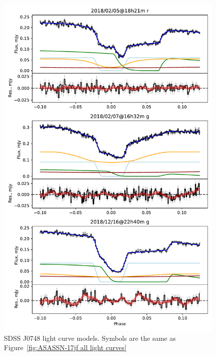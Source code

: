 \begin{figure}
    \centering
    \includegraphics[width=\textwidth]{figures/results/SDSS0748/SDSS0748_1.pdf}
    \caption{SDSS J0748 light curve models. Symbols are the same as Figure~\ref{fig:ASASSN-17jf all light curves}}
    \label{fig:SDSS J0748 all light curves}
\end{figure}

